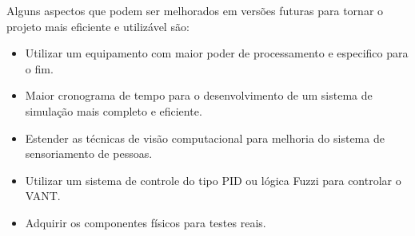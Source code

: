Alguns aspectos que podem ser melhorados em versões futuras para tornar o projeto
mais eficiente e utilizável são:

\begin{itemize}
	\item Utilizar um equipamento com maior poder de processamento e especifico para o fim.
	\item Maior cronograma de tempo para o desenvolvimento de um sistema de simulação mais completo e eficiente.
	\item Estender as técnicas de visão computacional para melhoria do sistema de sensoriamento de pessoas.
	\item Utilizar um sistema de controle do tipo PID ou lógica Fuzzi para controlar o VANT.
	\item Adquirir os componentes físicos para testes reais.
\end{itemize}